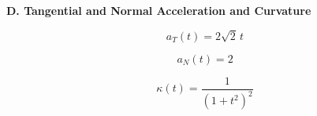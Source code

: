 \documentclass[10pt]{article}
\newcommand{\answerbar}[1]{%
  \vspace{0.55em}%
  \noindent\colorbox{sectiongray}{%
    \parbox{\dimexpr\textwidth-2\fboxsep\relax}{%
      \strut\textbf{#1}\strut
    }%
  }%
  \par\vspace{0.50em}%
}
\begin{document}
\vspace{0.25em}


\answerbar{D. Tangential and Normal Acceleration and Curvature}

\begin{parts}

\item
\[
\boxed{a_T(t)=2\sqrt2\,t}
\]

\item
\[
\boxed{a_N(t)=2}
\]

\item
\[
\boxed{\kappa(t)=\frac{1}{(1+t^2)^2}}
\]

\end{parts}
\end{document}
